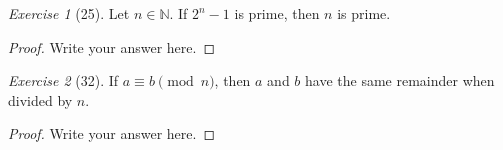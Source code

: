 \documentclass[12pt]{amsart}
\theoremstyle{remark}
\newtheorem*{exercise}{Exercise}%
\def\NN{\ensuremath{\mathbb N}}
\theoremstyle{mycomment}
\begin{document}
\begin{exercise}[25] Let $n\in\NN$. If $2^{n}-1$ is prime, then $n$ is prime.
\begin{proof}
Write your answer here.
\end{proof}
\end{exercise}

\begin{exercise}[32] If $a\equiv b\pmod n$, then $a$ and $b$ have the same remainder when divided by $n$.
\begin{proof}
Write your answer here.
\end{proof}
\end{exercise}





 
\end{document}
